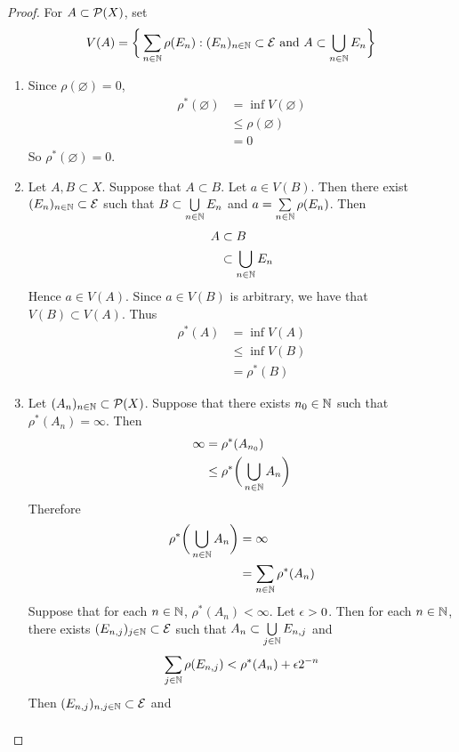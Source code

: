 \documentclass{book}
\begin{document}
	\begin{proof}For $A \subset \mathcal{P}(X)$, set 
		$$V(A) = \bigg \{\sum_{n \in \mathbb{N}}\rho(E_n): (E_n)_{n \in \mathbb{N}} \subset \mathcal{E} \text{ and }A \subset \bigcup_{n \in \mathbb{N}}E_n \bigg \}$$
		\begin{enumerate}
			\item Since $\rho(\varnothing) = 0$, 
			\begin{align*}
				\rho^*(\varnothing) 
				& =  \inf V(\varnothing) \\
				& \leq \rho(\varnothing) \\
				& = 0
			\end{align*}
			So $\rho^*(\varnothing) = 0$.
			\item Let $A,B \subset X$. Suppose that $A \subset B$. Let $a \in V(B)$. Then there exist $(E_n)_{n \in \mathbb{N}} \subset \mathcal{E}$ such that $B \subset \bigcup\limits_{n \in \mathbb{N}} E_n$ and $a = \sum\limits_{n \in \mathbb{N}} \rho(E_n)$. Then 
			\begin{align*}
				A
				& \subset B \\
				& \subset  \bigcup\limits_{n \in \mathbb{N}} E_n \\
			\end{align*}
			Hence $a \in V(A)$. Since $a \in V(B)$ is arbitrary, we have that $V(B) \subset V(A)$. Thus 
			\begin{align*}
				\rho^*(A)
				& = \inf V(A) \\
				& \leq \inf V(B) \\
				& = \rho^*(B)
			\end{align*}
			\item Let $(A_n)_{n \in \mathbb{N}} \subset \mathcal{P}(X)$. Suppose that there exists $n_0 \in \mathbb{N}$ such that $\rho^*(A_n)= \infty$. Then 
			\begin{align*}
				\infty 
				& = \rho^*(A_{n_0}) \\
				& \leq \rho^*\bigg(  \bigcup\limits_{n \in \mathbb{N}}A_n \bigg)
			\end{align*}
			Therefore
			\begin{align*}
				\rho^* \bigg( \bigcup_{n \in \mathbb{N}} A_n \bigg)
				& = \infty \\
				& = \sum_{n \in \mathbb{N}} \rho^*(A_n)
			\end{align*}
			Suppose that for each $n \in \mathbb{N}$, $\rho^*(A_n) < \infty$. Let $\epsilon > 0$. Then for each $n \in \mathbb{N}$, there exists $(E_{n,j})_{j \in \mathbb{N}} \subset \mathcal{E}$ such that $A_n \subset \bigcup\limits_{j \in \mathbb{N}} E_{n,j}$ and
			$$\sum_{j \in \mathbb{N}} \rho(E_{n,j}) < \rho^*(A_n) + \epsilon2^{-n}$$
			Then $(E_{n,j})_{n,j \in \mathbb{N}} \subset \mathcal{E}$ and 
			\begin{align*}

\end{align*}
\end{enumerate}
\end{proof}
\end{document}
